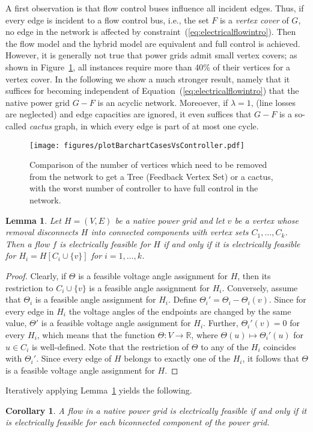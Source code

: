 \documentclass{article}[11pt,a4paper]
\newtheorem{lemma}[theorem]{Lemma}
\newtheorem{corollary}[theorem]{Corollary}
\newcommand{\plotscaleOne}{0.45}
\begin{document}
A first observation is that flow control buses influence all
incident edges.  Thus, if every edge is incident to a flow control bus, i.e., the set $F$ is a \emph{vertex cover} of $G$, no
edge in the network is affected by
constraint~(\ref{eq:electricalflowintro}).  Then the flow model and
the hybrid model are equivalent and full control is achieved.
However, it is generally not true that power grids admit small vertex
covers; as shown in Figure~\ref{fig:barchart-cases-controller}, all
instances require more than 40\% of their vertices for a vertex cover.
In the following we show a much stronger result, namely that it
suffices for becoming independent of 
Equation~(\ref{eq:electricalflowintro}) that the native power grid
$G-F$ is an acyclic network.  Moreoever, if $\lambda = 1$, (line
losses are neglected) and edge capacities are ignored, it even
suffices that $G-F$ is a so-called \emph{cactus} graph, in which every
edge is part of at most one cycle.
\begin{figure}[tb!]
  	\centering
\texttt{[image: figures/plotBarchartCasesVsController.pdf]}
    \caption{Comparison of the number of vertices which need to be
      removed from the network to get a Tree (Feedback Vertex Set) or
      a cactus, with the worst number of controller to have full
      control in the network.}
	\label{fig:barchart-cases-controller}
\end{figure}
\begin{lemma}
  \label{lem:decompose-powergrid-cutvertex}
  Let $H = (V,E)$ be a native power grid and let $v$ be a vertex whose
  removal disconnects $H$ into connected components with vertex sets
  $C_1,\dots,C_k$.  Then a flow $f$ is electrically feasible for $H$
  if and only if it is electrically feasible for $H_i = H[C_i \cup
  \{v\}]$ for $i=1,\dots,k$.
\end{lemma}
\begin{proof}
  Clearly, if $\Theta$ is a feasible voltage angle assignment for $H$, then its
  restriction to $C_i \cup \{v\}$ is a feasible angle assignment for $H_i$.
  Conversely, assume that $\Theta_i$ is a feasible angle assignment for
  $H_i$.  Define $\Theta_i' = \Theta_i - \Theta_i(v)$.  
  Since for
  every edge in $H_i$ the voltage angles of the endpoints are changed by the same value,
   $\Theta'$ is a feasible voltage angle assignment for $H_i$.
  Further, $\Theta_i'(v) = 0$ for every $H_i$, which means that the function $\Theta \colon V \to \mathbb{R}$, where $\Theta(u) \mapsto
    \Theta_i'(u)$ for $u \in C_i$ is well-defined.
  Note that the restriction of $\Theta$ to any of the $H_i$ coincides
  with $\Theta_i'$.  Since every edge of $H$ belongs to exactly one of
  the $H_i$, it follows that $\Theta$ is a feasible voltage angle assignment for $H$.
\end{proof}
Iteratively applying Lemma~\ref{lem:decompose-powergrid-cutvertex}
yields the following.
\begin{corollary}
  \label{cor:electrical-feasible-blocks}
  A flow in a native power grid is electrically feasible if and only
  if it is electrically feasible for each biconnected component of the
  power grid.
\end{corollary}
\end{document}
